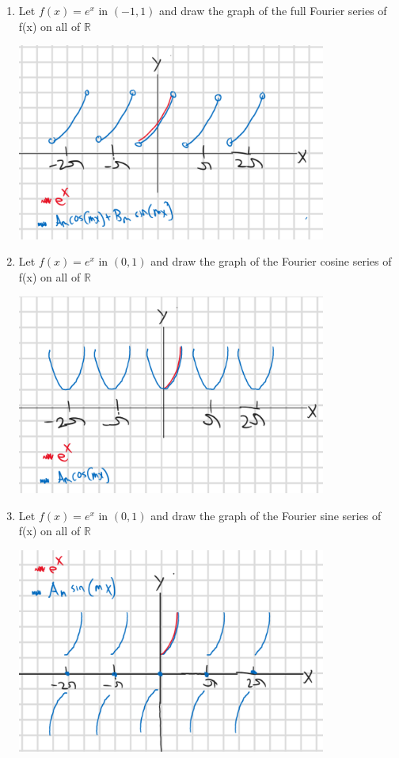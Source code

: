 \documentclass[12pt]{article}
\newcommand{\R}{\mathbb{R}}
\begin{document}
\begin{enumerate}
    \item Let $f(x) = e^x$ in $(-1, 1)$ and draw the graph of the full Fourier series of f(x) on all of $\R$
    
    \includegraphics[width=0.8\textwidth]{Images/full fourier.png}
    
    \pagebreak
    \item Let $f(x) = e^x$ in $(0, 1)$ and draw the graph of the Fourier cosine series of f(x) on all of $\R$
    
    \includegraphics[width=0.8\textwidth]{Images/cos.png}

    \item Let $f(x) = e^x$ in $(0, 1)$ and draw the graph of the Fourier sine series of f(x) on all of $\R$
     
    \includegraphics[width=0.8\textwidth]{Images/sin.png}
    
\end{enumerate}
\end{document}
